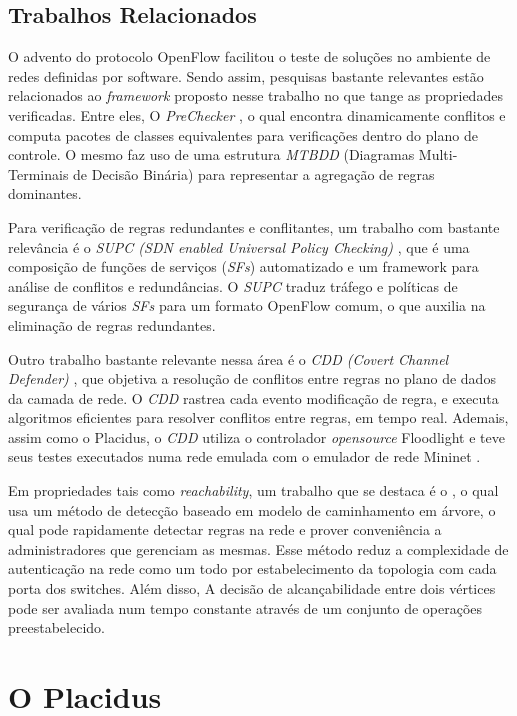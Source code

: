 \documentclass[12pt]{article}
\begin{document}
\subsection{Trabalhos Relacionados}

O advento do protocolo OpenFlow facilitou o teste de soluções no ambiente de redes definidas por software.
Sendo assim, pesquisas bastante relevantes estão relacionados ao \textit{framework} proposto nesse trabalho no que tange as propriedades verificadas.
Entre eles, O \textit{PreChecker} \cite{8738806}, o qual encontra dinamicamente conflitos e computa pacotes de classes equivalentes para verificações dentro do plano de controle. O mesmo faz uso de uma estrutura \textit{MTBDD} (Diagramas Multi-Terminais de Decisão Binária) para representar a agregação de regras dominantes.

Para verificação de regras redundantes e conflitantes, um trabalho com bastante relevância é o \textit{SUPC (SDN enabled Universal Policy Checking)} \cite{8685550}, que é uma composição de funções de serviços (\textit{SFs}) automatizado e um framework para análise de conflitos e redundâncias.
O \textit{SUPC} traduz tráfego e políticas de segurança de vários \textit{SFs} para um formato OpenFlow comum, o que auxilia na eliminação de regras redundantes.

Outro trabalho bastante relevante nessa área é o \textit{CDD (Covert
Channel Defender)} \cite{8428482}, que objetiva a resolução de conflitos entre regras no plano de dados da camada de rede.
O \textit{CDD} rastrea cada evento modificação de regra, e executa algoritmos eficientes para resolver conflitos entre regras, em tempo real.
Ademais, assim como o Placidus, o \textit{CDD} utiliza o controlador \textit{opensource} Floodlight \cite{7491821} e teve seus testes executados numa rede emulada com o emulador de rede Mininet \cite{6860404}.

Em propriedades tais como \textit{reachability}, um trabalho que se destaca é o \cite{8342927}, o qual usa um método de detecção baseado em modelo de caminhamento em árvore, o qual pode rapidamente detectar regras na rede e prover conveniência a administradores que gerenciam as mesmas. Esse método reduz a complexidade de autenticação na rede como um todo por estabelecimento da topologia com cada porta dos switches. Além disso, A decisão de alcançabilidade entre dois vértices pode ser avaliada num tempo constante através de um conjunto de operações preestabelecido.


\section{O Placidus}
\end{document}
